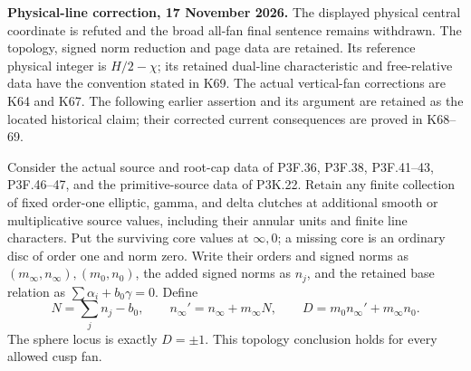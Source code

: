 \begin{theorem}\label{night:P3K.32}
\par\noindent\textbf{Physical-line correction, 17 November 2026.} The displayed physical central coordinate is refuted and the broad all-fan final sentence remains withdrawn. The topology, signed norm reduction and page data are retained. Its reference physical integer is \(H/2-\chi\); its retained dual-line characteristic and free-relative data have the convention stated in K69. The actual vertical-fan corrections are K64 and K67. The following earlier assertion and its argument are retained as the located historical claim; their corrected current consequences are proved in K68--69.\medskip\par 
Consider the actual source and root-cap data of P3F.36, P3F.38,
P3F.41--43, P3F.46--47, and the primitive-source data of P3K.22.
Retain any finite collection of fixed order-one elliptic, gamma,
and delta clutches at additional smooth or multiplicative source
values, including their annular units and finite line characters.
Put the surviving core values at $\infty,0$; a missing core is
an ordinary disc of order one and norm zero. Write their orders
and signed norms as $(m_\infty,n_\infty),(m_0,n_0)$, the added
signed norms as $n_j$, and the retained base relation as
$\sum\alpha_i+b_0\gamma=0$. Define
\[
 N=\sum_jn_j-b_0,\qquad
 n_\infty'=n_\infty+m_\infty N,\qquad
 D=m_0n_\infty'+m_\infty n_0.                         \tag{K32.1}
\]
The sphere locus is exactly $D=\pm1$. This topology conclusion
holds for every allowed cusp fan.


\end{theorem}
